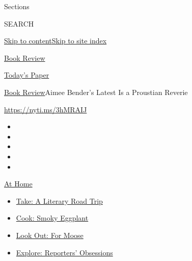 Sections

SEARCH

\protect\hyperlink{site-content}{Skip to
content}\protect\hyperlink{site-index}{Skip to site index}

\href{https://www.nytimes3xbfgragh.onion/section/books/review}{Book
Review}

\href{https://myaccount.nytimes3xbfgragh.onion/auth/login?response_type=cookie\&client_id=vi}{}

\href{https://www.nytimes3xbfgragh.onion/section/todayspaper}{Today's
Paper}

\href{/section/books/review}{Book Review}\textbar{}Aimee Bender's Latest
Is a Proustian Reverie

\url{https://nyti.ms/3hMRAIJ}

\begin{itemize}
\item
\item
\item
\item
\item
\end{itemize}

\href{https://www.nytimes3xbfgragh.onion/spotlight/at-home?action=click\&pgtype=Article\&state=default\&region=TOP_BANNER\&context=at_home_menu}{At
Home}

\begin{itemize}
\tightlist
\item
  \href{https://www.nytimes3xbfgragh.onion/2020/07/28/books/time-for-a-literary-road-trip.html?action=click\&pgtype=Article\&state=default\&region=TOP_BANNER\&context=at_home_menu}{Take:
  A Literary Road Trip}
\item
  \href{https://www.nytimes3xbfgragh.onion/2020/07/29/magazine/bored-with-your-home-cooking-some-smoky-eggplant-will-fix-that.html?action=click\&pgtype=Article\&state=default\&region=TOP_BANNER\&context=at_home_menu}{Cook:
  Smoky Eggplant}
\item
  \href{https://www.nytimes3xbfgragh.onion/2020/07/27/travel/moose-michigan-isle-royale.html?action=click\&pgtype=Article\&state=default\&region=TOP_BANNER\&context=at_home_menu}{Look
  Out: For Moose}
\item
  \href{https://www.nytimes3xbfgragh.onion/interactive/2020/at-home/even-more-reporters-editors-diaries-lists-recommendations.html?action=click\&pgtype=Article\&state=default\&region=TOP_BANNER\&context=at_home_menu}{Explore:
  Reporters' Obsessions}
\end{itemize}


